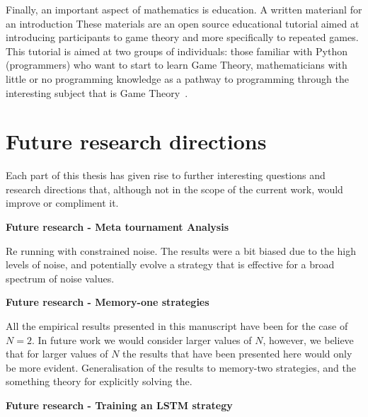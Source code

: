 Finally, an important aspect of mathematics is education. A written materianl
for an introduction These materials are an open source educational tutorial
aimed at introducing participants to game theory and more specifically to
repeated games. This tutorial is aimed at two groups of individuals: those
familiar with Python (programmers) who want to start to learn Game Theory,
mathematicians with little or no programming knowledge as a pathway to
programming through the interesting subject that is Game Theory~\cite{Glynatsi2017_game}.

\section{Future research directions}

Each part of this thesis has given rise to further interesting questions and
research directions that, although not in the scope of the current work, would
improve or compliment it.

\textbf{Future research - Meta tournament Analysis}

Re running with constrained noise. The results were a bit biased due to
the high levels of noise, and potentially evolve a strategy that is effective
for a broad spectrum of noise values.

\textbf{Future research - Memory-one strategies}

All the empirical results presented in this manuscript have been for the
case of $N=2$. In future work we would consider larger values of $N$, however, we
believe that for larger values of $N$ the results that have been presented here would
only be more evident. Generalisation of the results to memory-two strategies, and
the something theory for explicitly solving the.

\textbf{Future research - Training an LSTM strategy}

